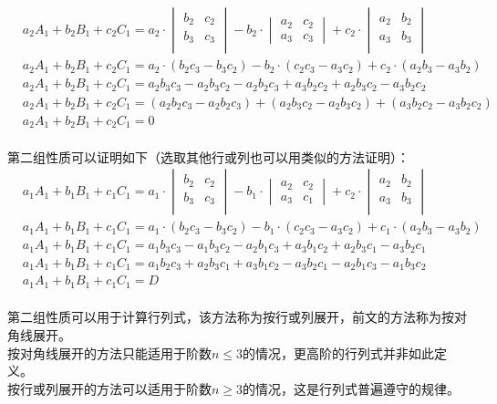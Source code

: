 \documentclass[UTF8]{ctexart}
\begin{document}
    \begin{align}
        &a_2A_1+b_2B_1+c_2C_1=a_2\cdot\begin{vmatrix}b_2&c_2\\b_3&c_3\\\end{vmatrix}-b_2\cdot\begin{vmatrix}a_2&c_2\\a_3&c_3\end{vmatrix}+c_2\cdot\begin{vmatrix}a_2&b_2\\a_3&b_3\\\end{vmatrix}\\[3mm]
        &a_2A_1+b_2B_1+c_2C_1=a_2\cdot(b_2c_3-b_3c_2)-b_2\cdot(c_2c_3-a_3c_2)+c_2\cdot(a_2b_3-a_3b_2)\\[3mm]
        &a_2A_1+b_2B_1+c_2C_1=a_2b_3c_3-a_2b_3c_2-a_2b_2c_3+a_3b_2c_2+a_2b_3c_2-a_3b_2c_2\\[3mm]
        &a_2A_1+b_2B_1+c_2C_1=(a_2b_2c_3-a_2b_2c_3)+(a_2b_3c_2-a_2b_3c_2)+(a_3b_2c_2-a_3b_2c_2)\\[3mm]
        &a_2A_1+b_2B_1+c_2C_1=0
    \end{align}\\
    第二组性质可以证明如下（选取其他行或列也可以用类似的方法证明）：\vspace{5pt}
    \setcounter{equation}{0}
    \begin{align}
        &a_1A_1+b_1B_1+c_1C_1=a_1\cdot\begin{vmatrix}b_2&c_2\\b_3&c_3\\\end{vmatrix}-b_1\cdot\begin{vmatrix}a_2&c_2\\a_3&c_1\end{vmatrix}+c_2\cdot\begin{vmatrix}a_2&b_2\\a_3&b_3\\\end{vmatrix}\\[3mm]
        &a_1A_1+b_1B_1+c_1C_1=a_1\cdot(b_2c_3-b_3c_2)-b_1\cdot(c_2c_3-a_3c_2)+c_1\cdot(a_2b_3-a_3b_2)~~\\[3mm]
        &a_1A_1+b_1B_1+c_1C_1=a_1b_3c_3-a_1b_3c_2-a_2b_1c_3+a_3b_1c_2+a_2b_3c_1-a_3b_2c_1\\[3mm]
        &a_1A_1+b_1B_1+c_1C_1=a_1b_2c_3+a_2b_3c_1+a_3b_1c_2-a_3b_2c_1-a_2b_1c_3-a_1b_3c_2\\[3mm]
        &a_1A_1+b_1B_1+c_1C_1=D
    \end{align}\\
    第二组性质可以用于计算行列式，该方法称为按行或列展开，前文的方法称为按对角线展开。\\[3mm]
    按对角线展开的方法只能适用于阶数$n\leq 3$的情况，更高阶的行列式并非如此定义。\\[3mm]
    按行或列展开的方法可以适用于阶数$n\geq 3$的情况，这是行列式普遍遵守的规律。
\end{document}
